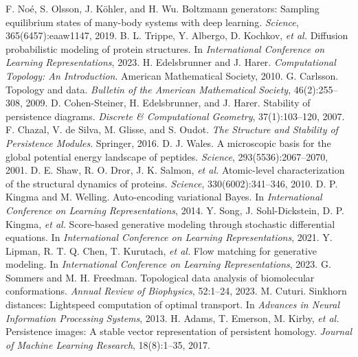 \documentclass[11pt]{article}
\begin{document}
\begin{thebibliography}{99}
 F. No{\'e}, S. Olsson, J. K{\"o}hler, and H. Wu. Boltzmann generators: Sampling equilibrium states of many-body systems with deep learning. \emph{Science}, 365(6457):eaaw1147, 2019.
 B. L. Trippe, Y. Albergo, D. Kochkov, \emph{et al.} Diffusion probabilistic modeling of protein structures. In \emph{International Conference on Learning Representations}, 2023.
 H. Edelsbrunner and J. Harer. \emph{Computational Topology: An Introduction}. American Mathematical Society, 2010.
 G. Carlsson. Topology and data. \emph{Bulletin of the American Mathematical Society}, 46(2):255--308, 2009.
 D. Cohen-Steiner, H. Edelsbrunner, and J. Harer. Stability of persistence diagrams. \emph{Discrete \& Computational Geometry}, 37(1):103--120, 2007.
 F. Chazal, V. de Silva, M. Glisse, and S. Oudot. \emph{The Structure and Stability of Persistence Modules}. Springer, 2016.
 D. J. Wales. A microscopic basis for the global potential energy landscape of peptides. \emph{Science}, 293(5536):2067--2070, 2001.
 D. E. Shaw, R. O. Dror, J. K. Salmon, \emph{et al.} Atomic-level characterization of the structural dynamics of proteins. \emph{Science}, 330(6002):341--346, 2010.
 D. P. Kingma and M. Welling. Auto-encoding variational Bayes. In \emph{International Conference on Learning Representations}, 2014.
 Y. Song, J. Sohl-Dickstein, D. P. Kingma, \emph{et al.} Score-based generative modeling through stochastic differential equations. In \emph{International Conference on Learning Representations}, 2021.
 Y. Lipman, R. T. Q. Chen, T. Kurutach, \emph{et al.} Flow matching for generative modeling. In \emph{International Conference on Learning Representations}, 2023.
 G. Sommers and M. H. Freedman. Topological data analysis of biomolecular conformations. \emph{Annual Review of Biophysics}, 52:1--24, 2023.
 M. Cuturi. Sinkhorn distances: Lightspeed computation of optimal transport. In \emph{Advances in Neural Information Processing Systems}, 2013.
 H. Adams, T. Emerson, M. Kirby, \emph{et al.} Persistence images: A stable vector representation of persistent homology. \emph{Journal of Machine Learning Research}, 18(8):1--35, 2017.
\end{thebibliography}
\end{document}
